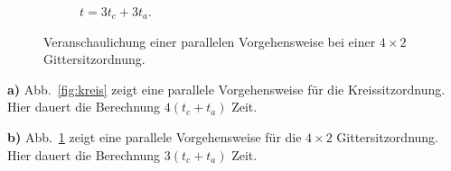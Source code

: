 \begin{figure}[tbp]
\begin{subfigure}{.33\textwidth}
 \caption{$t=3t_c+3t_a$.}
\end{subfigure}
%
\caption{Veranschaulichung einer parallelen Vorgehensweise bei einer $4\times2$ Gittersitzordnung.}
\label{fig:gitter}
\end{figure}

\textbf{a)} Abb.~\ref{fig:kreis} zeigt eine parallele Vorgehensweise für die Kreissitzordnung. Hier dauert die Berechnung $4(t_c+t_a)$ Zeit.\medskip 

\textbf{b)} Abb.~\ref{fig:gitter} zeigt eine parallele Vorgehensweise für die $4\times2$ Gittersitzordnung. Hier dauert die Berechnung $3(t_c+t_a)$ Zeit.